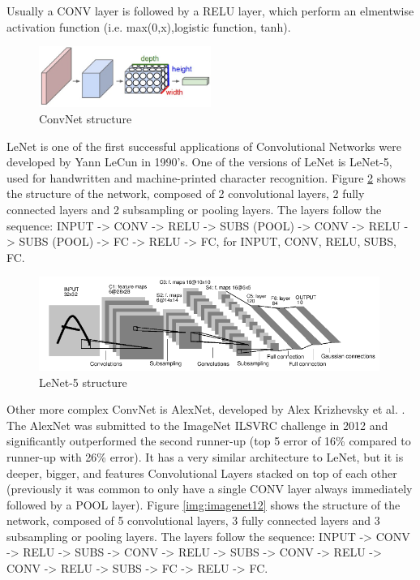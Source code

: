 \documentclass[]{article}
\begin{document}
Usually a CONV layer is followed by a RELU layer, which perform an elmentwise activation function (i.e. max(0,x),logistic function, tanh).

\begin{figure}[htpb!]
\centering
\includegraphics[width= 0.5\textwidth]{images/cnn}
\caption{ConvNet structure \cite{cs231convnets}\label{img:cnn}}
\end{figure}


LeNet is one of the first successful applications of Convolutional Networks were developed by Yann LeCun in 1990’s. One of the versions of LeNet is LeNet-5, used for handwritten and machine-printed character recognition. Figure \ref{img:lenet5} shows the structure of the network, composed of 2 convolutional layers, 2 fully connected layers and 2 subsampling or pooling layers. The layers follow the sequence: INPUT -> CONV -> RELU -> SUBS (POOL) -> CONV -> RELU -> SUBS (POOL) -> FC -> RELU -> FC, for INPUT, CONV, RELU, SUBS, FC. %
\begin{figure}[htpb!]
\centering
\includegraphics[width= 0.99\textwidth]{images/lenet5}
\caption{LeNet-5 structure \cite{Lecun98} \label{img:lenet5}}
\end{figure}

Other more complex ConvNet is AlexNet, developed by Alex Krizhevsky et al. \cite{Krizhevsky12}. The AlexNet was submitted to the ImageNet ILSVRC challenge in 2012 and significantly outperformed the second runner-up (top 5 error of 16\% compared to runner-up with 26\% error). It has a very similar architecture to LeNet, but it is  deeper, bigger, and features Convolutional Layers stacked on top of each other (previously it was common to only have a single CONV layer always immediately followed by a POOL layer)\cite{cs231convnets}. Figure \ref{img:imagenet12} shows the structure of the network, composed of 5 convolutional layers, 3 fully connected layers and 3 subsampling or pooling layers. The layers follow the sequence: INPUT -> CONV -> RELU -> SUBS -> CONV -> RELU -> SUBS -> CONV -> RELU -> CONV -> RELU -> SUBS -> FC -> RELU -> FC. %
\end{document}
